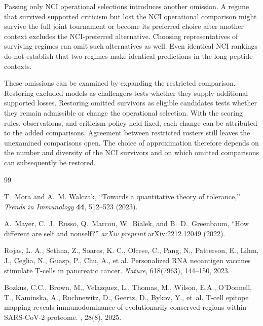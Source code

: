 \documentclass[11pt]{article}
\begin{document}
Passing only NCI operational selections introduces another omission. A regime
that survived supported criticism but lost the NCI operational comparison might
survive the full joint tournament or become its preferred choice after another
context excludes the NCI-preferred alternative. Choosing representatives of
surviving regimes can omit such alternatives as well. Even identical NCI
rankings do not establish that two regimes make identical predictions in the
long-peptide contexts.

These omissions can be examined by expanding the restricted comparison.
Restoring excluded models as challengers tests whether they supply additional
supported losses. Restoring omitted survivors as eligible candidates tests
whether they remain admissible or change the operational selection. With the
scoring rules, observations, and criticism policy held fixed, each change can
be attributed to the added comparisons. Agreement between restricted rosters
still leaves the unexamined comparisons open. The choice of approximation
therefore depends on the number and diversity of the NCI survivors and on which
omitted comparisons can subsequently be restored.

\newpage
\begin{thebibliography}{99}

T.~Mora and A.~M. Walczak,
``Towards a quantitative theory of tolerance,''
\emph{Trends in Immunology} \textbf{44}, 512--523 (2023).

A.~Mayer, C.~J.~Russo, Q.~Marcou, W.~Bialek, and B.~D.~Greenbaum,
``How different are self and nonself?''
\emph{arXiv preprint} arXiv:2212.12049 (2022).

Rojas, L. A., Sethna, Z., Soares, K. C., Olcese, C., Pang, N.,
Patterson, E., Lihm, J., Ceglia, N., Guasp, P., Chu, A., et al.
Personalized RNA neoantigen vaccines stimulate T-cells in pancreatic cancer.
\textit{Nature}, 618(7963), 144--150, 2023.

Bozkus, C.C., Brown, M., Velazquez, L., Thomas, M., Wilson, E.A., O'Donnell, T.,
Kaminska, A., Ruchnewitz, D., Geertz, D., Bykov, Y., et~al.
\newblock T-cell epitope mapping reveals immunodominance of evolutionarily
conserved regions within {SARS-CoV-2} proteome.
, 28(8), 2025.
\end{thebibliography}
\end{document}

